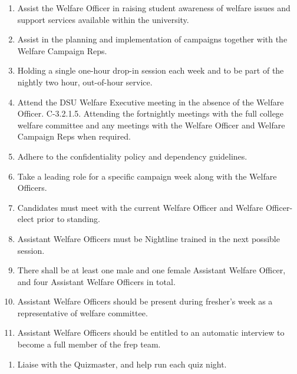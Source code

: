\begin{enumerate}
    \item  Assist the Welfare Officer in raising student awareness of welfare issues and support
    services available within the university.
    \item Assist in the planning and implementation of campaigns together with the Welfare Campaign Reps.
    \item Holding a single one-hour drop-in session each week and to be part of the nightly two hour, out-of-hour service.
    \item  Attend the DSU Welfare Executive meeting in the absence of the Welfare Officer. C-3.2.1.5. Attending the fortnightly meetings with the full college welfare committee and any
    meetings with the Welfare Officer and Welfare Campaign Reps when required. 
    \item Adhere to the confidentiality policy and dependency guidelines.
    \item Take a leading role for a specific campaign week along with the Welfare Officers.
    \item Candidates must meet with the current Welfare Officer and Welfare Officer-elect prior to standing. 
    \item Assistant Welfare Officers must be Nightline trained in the next possible session.
    \item There shall be at least one male and one female Assistant Welfare Officer, and four Assistant Welfare Officers in total.
    \item Assistant Welfare Officers should be present during fresher’s week as a representative of welfare committee.
    \item Assistant Welfare Officers should be entitled to an automatic interview to become a full member of the frep team.
    
    
    
\end{enumerate}

\begin{enumerate}
    \item Liaise with the Quizmaster, and help run each quiz night.
    
\end{enumerate}

